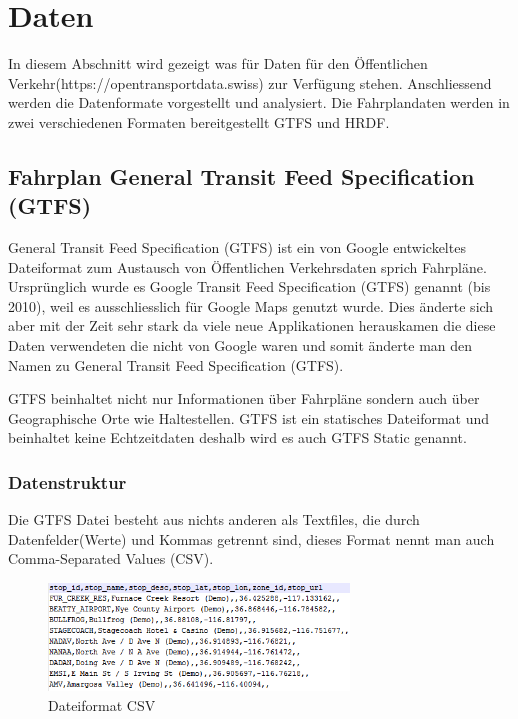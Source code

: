 \documentclass[a4paper,12pt]{scrartcl}
\begin{document}
\section{Daten}
\label{sec:daten}
In diesem Abschnitt wird gezeigt was für Daten für den Öffentlichen Verkehr(https://opentransportdata.swiss) zur Verfügung stehen. Anschliessend werden die Datenformate vorgestellt und analysiert. Die Fahrplandaten werden in zwei verschiedenen Formaten bereitgestellt GTFS und HRDF. 

\subsection{Fahrplan General Transit Feed Specification (GTFS)}
\label{sec:gtfs-static}
General Transit Feed Specification (GTFS) ist ein von Google entwickeltes Dateiformat zum Austausch von Öffentlichen Verkehrsdaten sprich Fahrpläne. Ursprünglich wurde es Google Transit Feed Specification (GTFS) genannt (bis 2010), weil es ausschliesslich für Google Maps genutzt wurde. Dies änderte sich aber mit der Zeit sehr stark da viele neue Applikationen herauskamen die diese Daten verwendeten die nicht von Google waren und somit änderte man den Namen zu General Transit Feed Specification (GTFS).

GTFS beinhaltet nicht nur Informationen über Fahrpläne sondern auch über Geographische Orte wie Haltestellen. GTFS ist ein statisches Dateiformat und beinhaltet keine Echtzeitdaten deshalb wird es auch GTFS Static genannt. 

\subsubsection{Datenstruktur}
\label{sec:gtfs-datenstruktur}
Die GTFS Datei besteht aus nichts anderen als Textfiles, die durch Datenfelder(Werte) und Kommas getrennt sind, dieses Format nennt man auch Comma-Separated Values (CSV).
\begin{figure}[]
	\centering
	\includegraphics[width=8cm]{img/bspcsv.png}
	\caption{Dateiformat CSV}
	\label{fig:gtfs-dateiformat}
\end{figure}
\end{document}
